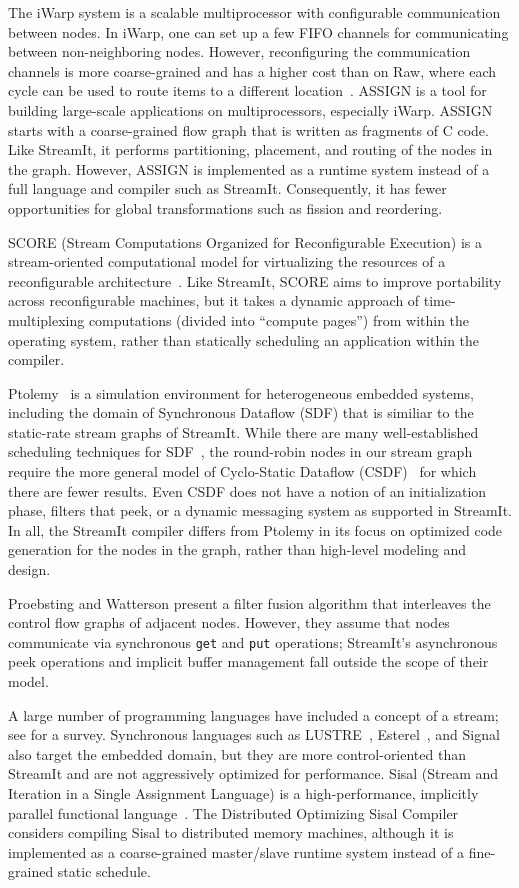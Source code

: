 The iWarp system \cite{iwarp} is a scalable multiprocessor with
configurable communication between nodes.  In iWarp, one can set up a
few FIFO channels for communicating between non-neighboring
nodes. However, reconfiguring the communication channels is more
coarse-grained and has a higher cost than on Raw, where each cycle can
be used to route items to a different location~\cite{scalaroperands}.
ASSIGN \cite{assign} is a tool for building large-scale applications
on multiprocessors, especially iWarp.  ASSIGN starts with a
coarse-grained flow graph that is written as fragments of C code.
Like StreamIt, it performs partitioning, placement, and routing of the
nodes in the graph.  However, ASSIGN is implemented as a runtime
system instead of a full language and compiler such as StreamIt.
Consequently, it has fewer opportunities for global transformations
such as fission and reordering.

SCORE (Stream Computations Organized for Reconfigurable Execution) is
a stream-oriented computational model for virtualizing the resources
of a reconfigurable architecture~\cite{score}.  Like StreamIt, SCORE
aims to improve portability across reconfigurable machines, but it
takes a dynamic approach of time-multiplexing computations (divided
into ``compute pages'') from within the operating system, rather than
statically scheduling an application within the compiler.

Ptolemy~\cite{ptolemyoverview} is a simulation environment for
heterogeneous embedded systems, including the domain of Synchronous
Dataflow (SDF) that is similiar to the static-rate stream graphs of
StreamIt.  While there are many well-established scheduling techniques
for SDF~\cite{leesdf}, the round-robin nodes in our stream graph
require the more general model of Cyclo-Static Dataflow
(CSDF)~\cite{BELP96} for which there are fewer results.  Even CSDF
does not have a notion of an initialization phase, filters that peek,
or a dynamic messaging system as supported in StreamIt.  In all, the
StreamIt compiler differs from Ptolemy in its focus on optimized code
generation for the nodes in the graph, rather than high-level modeling
and design.

Proebsting and Watterson \cite{pro96} present a filter fusion
algorithm that interleaves the control flow graphs of adjacent nodes.
However, they assume that nodes communicate via synchronous {\tt get}
and {\tt put} operations; StreamIt's asynchronous peek operations and
implicit buffer management fall outside the scope of their model.

A large number of programming languages have included a concept of a
stream; see \cite{survey97} for a survey.  Synchronous languages such
as LUSTRE~\cite{lustre}, Esterel~\cite{esterel92}, and
Signal~\cite{signal} also target the embedded domain, but they are
more control-oriented than StreamIt and are not aggressively optimized
for performance.  Sisal (Stream and Iteration in a Single Assignment
Language) is a high-performance, implicitly parallel functional
language~\cite{sisal}.  The Distributed Optimizing Sisal
Compiler~\cite{sisal} considers compiling Sisal to distributed memory
machines, although it is implemented as a coarse-grained master/slave
runtime system instead of a fine-grained static schedule.

